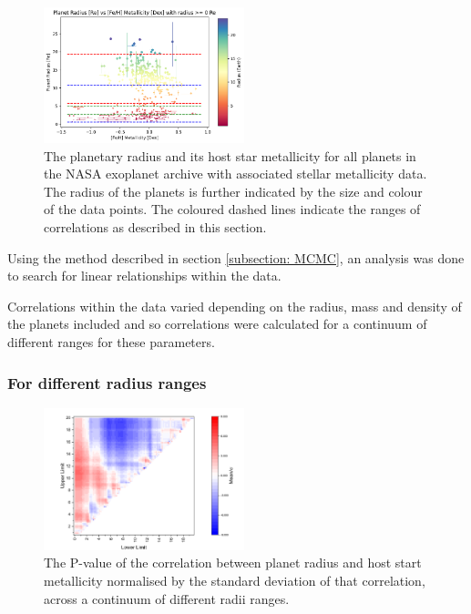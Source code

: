 \documentclass[a4paper,twocolumn,12pt]{article}
\begin{document}
\begin{figure}[h!]
    \centering
    \includegraphics[width=0.52\textwidth]{Graphs/FeH vs Radius Parameter Plot.png}
    \caption{The planetary radius and its host star metallicity for all planets in the NASA exoplanet archive with associated stellar metallicity data. The radius of the planets is further indicated by the size and colour of the data points. The coloured dashed lines indicate the ranges of correlations as described in this section.}
    \label{figure: Fe/H vs radius parameter plot}
\end{figure}

Using the method described in section \ref{subsection: MCMC}, an analysis was done to search for linear relationships within the data.

Correlations within the data varied depending on the radius, mass and density of the planets included and so correlations were calculated for a continuum of different ranges for these parameters.

\subsubsection{For different radius ranges}

\begin{figure}[h!]
    \centering
    \includegraphics[width=0.52\textwidth]{Graphs/FeH vs radius correlations 2.pdf}
    \caption{The P-value of the correlation between planet radius and host start metallicity normalised by the standard deviation of that correlation, across a continuum of different radii ranges.}
    \label{figure: Fe/H vs radius correlations}
\end{figure}
\end{document}
